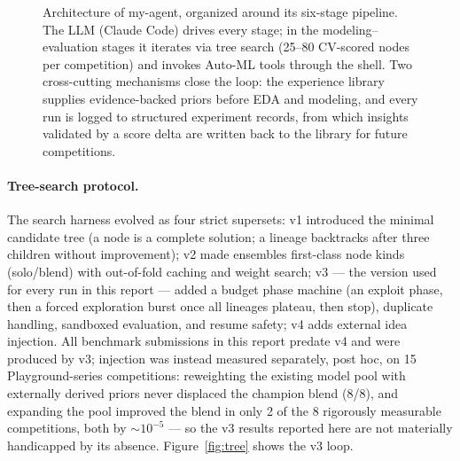 \documentclass[11pt,a4paper]{article}
\begin{document}
\begin{figure}[htbp]
\caption{Architecture of my-agent, organized around its six-stage pipeline. The LLM (Claude Code) drives every stage; in the modeling--evaluation stages it iterates via tree search (25--80 CV-scored nodes per competition) and invokes Auto-ML tools through the shell. Two cross-cutting mechanisms close the loop: the experience library supplies evidence-backed priors before EDA and modeling, and every run is logged to structured experiment records, from which insights validated by a score delta are written back to the library for future competitions.}
\label{fig:arch}
\end{figure}

\paragraph{Tree-search protocol.} The search harness evolved as four strict supersets: v1 introduced the minimal candidate tree (a node is a complete solution; a lineage backtracks after three children without improvement); v2 made ensembles first-class node kinds (solo/blend) with out-of-fold caching and weight search; v3 --- the version used for every run in this report --- added a budget phase machine (an exploit phase, then a forced exploration burst once all lineages plateau, then stop), duplicate handling, sandboxed evaluation, and resume safety; v4 adds external idea injection. All benchmark submissions in this report predate v4 and were produced by v3; injection was instead measured separately, post hoc, on 15 Playground-series competitions: reweighting the existing model pool with externally derived priors never displaced the champion blend (8/8), and expanding the pool improved the blend in only 2 of the 8 rigorously measurable competitions, both by ${\sim}10^{-5}$ --- so the v3 results reported here are not materially handicapped by its absence. Figure~\ref{fig:tree} shows the v3 loop.
\end{document}
